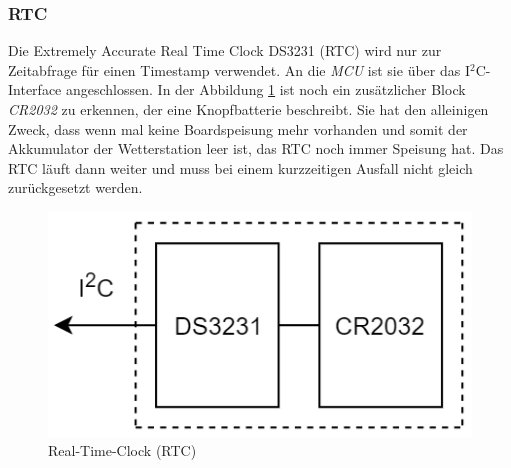 \subsubsection{RTC}
Die Extremely Accurate Real Time Clock DS3231 (RTC) wird nur zur Zeitabfrage für einen Timestamp verwendet. An die \textit{MCU} ist sie über das I$^{2}$C-Interface angeschlossen. In der Abbildung \ref{fig:rtc} ist noch ein zusätzlicher Block \textit{CR2032} zu erkennen, der eine Knopfbatterie beschreibt. Sie hat den alleinigen Zweck, dass wenn mal keine Boardspeisung mehr vorhanden und somit der Akkumulator der Wetterstation leer ist, das RTC noch immer Speisung hat. Das RTC läuft dann weiter und muss bei einem kurzzeitigen Ausfall nicht gleich zurückgesetzt werden.\\

\begin{figure}[h]
	\centering
	\includegraphics[scale=0.6]{graphics/Konzeptdiagramme/rtc.PNG}
	\caption{Real-Time-Clock (RTC)}
	\label{fig:rtc}
\end{figure}


